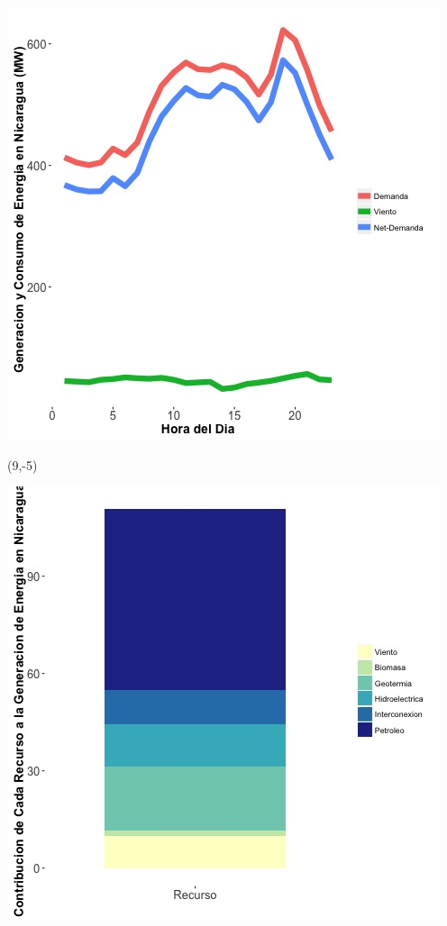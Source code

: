 \documentclass{article}\usepackage[]{graphicx}\usepackage[]{color}
\newenvironment{knitrout}{}{} %
\begin{document}
\begin{knitrout}
\color{fgcolor}
\includegraphics[scale=0.65]{figure/gridplot1.jpg} 
\end{knitrout}

\begin{textblock}{1}(9,-5)
\begin{minipage}{20em}
\begingroup

\endgroup
\end{minipage}
\end{textblock}

\vspace{2cm}

\begin{knitrout}
\color{fgcolor}
\includegraphics[scale=0.65]{figure/gridplot2.jpg} 
\end{knitrout}
\end{document}
